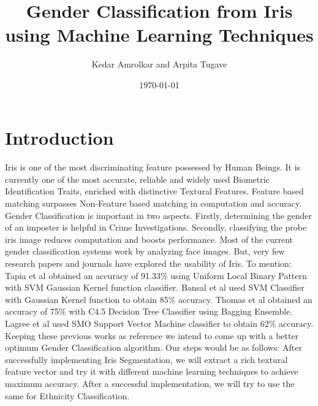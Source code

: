 \documentclass[11pt]{article}
\title{Gender Classification from Iris using Machine Learning Techniques}
\author{Kedar Amrolkar and Arpita Tugave}
\date{\today}
\begin{document}
\maketitle
{}

\section{Introduction}
\paragraph{}
Iris is one of the most discriminating feature possessed by Human Beings. It is currently one of the most accurate, reliable and widely used Biometric Identification Traits, enriched with distinctive Textural Features. Feature based matching surpasses Non-Feature based matching in computation and accuracy. Gender Classification is important in two aspects. Firstly, determining the gender of an imposter is helpful in Crime Investigations. Secondly, classifying the probe iris image reduces computation and boosts performance. Most of the current gender classification systems work by analyzing face images. But, very few research papers and journals have explored the usability of Iris.  To mention: Tapia et al \cite{Tapia} obtained an accuracy of 91.33\% using Uniform Local Binary Pattern with SVM Gaussian Kernel function classifier. Bansal et al \cite{Bansal} used SVM Classifier with Gaussian Kernel function to obtain 85\% accuracy. Thomas et al \cite{Thomas} obtained an accuracy of 75\% with C4.5 Decision Tree Classifier using Bagging Ensemble. Lagree et al \cite{Lagree} used SMO Support Vector Machine classifier to obtain 62\% accuracy. Keeping these previous works as reference we intend to come up with a better optimum Gender Classification algorithm. Our steps would be as follows: After successfully implementing Iris Segmentation, we will extract a rich textural feature vector and try it with different machine learning techniques to achieve maximum accuracy. After a successful implementation, we will try to use the same for Ethnicity Classification. 


{}
\end{document}
